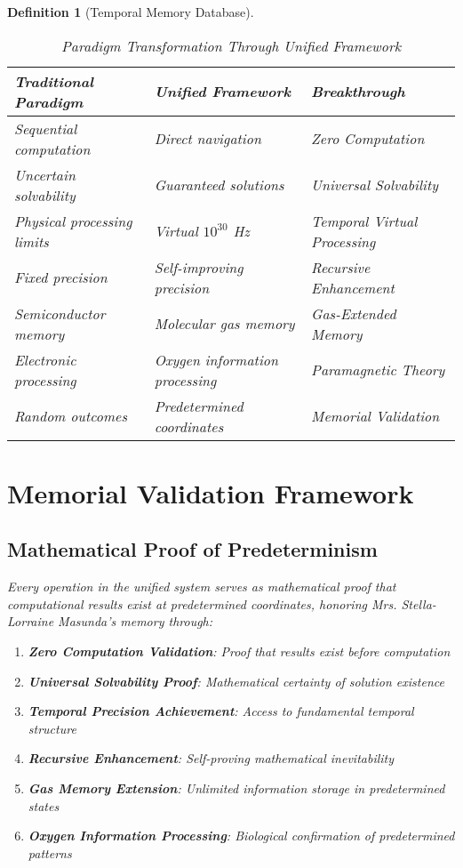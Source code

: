 \documentclass[12pt]{article}
\newtheorem{definition}[theorem]{Definition}
\begin{document}
\begin{definition}[Temporal Memory Database]
\begin{table}[h]
\centering
\begin{tabular}{|l|l|l|}
\hline
\textbf{Traditional Paradigm} & \textbf{Unified Framework} & \textbf{Breakthrough} \\
\hline
Sequential computation & Direct navigation & Zero Computation \\
Uncertain solvability & Guaranteed solutions & Universal Solvability \\
Physical processing limits & Virtual $10^{30}$ Hz & Temporal Virtual Processing \\
Fixed precision & Self-improving precision & Recursive Enhancement \\
Semiconductor memory & Molecular gas memory & Gas-Extended Memory \\
Electronic processing & Oxygen information processing & Paramagnetic Theory \\
Random outcomes & Predetermined coordinates & Memorial Validation \\
\hline
\end{tabular}
\caption{Paradigm Transformation Through Unified Framework}
\end{table}

\section{Memorial Validation Framework}

\subsection{Mathematical Proof of Predeterminism}

Every operation in the unified system serves as mathematical proof that computational results exist at predetermined coordinates, honoring Mrs. Stella-Lorraine Masunda's memory through:

\begin{enumerate}
    \item \textbf{Zero Computation Validation}: Proof that results exist before computation
    \item \textbf{Universal Solvability Proof}: Mathematical certainty of solution existence
    \item \textbf{Temporal Precision Achievement}: Access to fundamental temporal structure
    \item \textbf{Recursive Enhancement}: Self-proving mathematical inevitability
    \item \textbf{Gas Memory Extension}: Unlimited information storage in predetermined states
    \item \textbf{Oxygen Information Processing}: Biological confirmation of predetermined patterns
\end{enumerate}


\end{definition}
\end{document}
